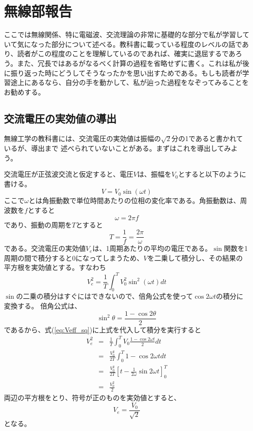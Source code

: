 \chapter*{無線部報告}
ここでは無線関係、特に電磁波、交流理論の非常に基礎的な部分で私が学習していて気になった部分について述べる。教科書に載っている程度のレベルの話であり、読者がこの程度のことを理解しているのであれば、確実に退屈するであろう。また、冗長ではあるがなるべく計算の過程を省略せずに書く。これは私が後に振り返った時にどうしてそうなったかを思い出すためである。もしも読者が学習途上にあるなら、自分の手を動かして、私が辿った過程をなぞってみることをお勧めする。

\section*{交流電圧の実効値の導出}
無線工学の教科書には、交流電圧の実効値は振幅の$\sqrt{2}$分の1であると書かれているが、導出まで
述べられていないことがある。まずはこれを導出してみよう。

交流電圧が正弦波交流と仮定すると、電圧$V$は、振幅を$V_0$とすると以下のように書ける。
\begin{equation}
V=V_0 \sin(\omega t) \label{eq:defv}
\end{equation}
ここで$\omega$とは角振動数で単位時間あたりの位相の変化率である。角振動数は、周波数を$f$とすると
\[
\omega = 2 \pi f
\]
であり、振動の周期を$T$とすると
\[
T = \frac{1}{f} = \frac{2 \pi}{\omega}
\]
である。交流電圧の実効値$V_e$は、1周期あたりの平均の電圧である。$\sin$関数を1周期の間で積分すると$0$になってしまうため、$V$を二乗して積分し、その結果の平方根を実効値とする。すなわち
\begin{equation}
V_e^2 =\frac{1}{T} \int_{0}^{T}V_0^2\sin^2(\omega t)dt \label{eq:Veff_sq}
\end{equation}
$\sin$の二乗の積分はすぐにはできないので、倍角公式を使って$\cos 2\omega t$の積分に変換する。
倍角公式は、
\[
\sin^2\theta = \frac{1-\cos 2\theta}{2}
\]
であるから、式(\ref{eq:Veff_sq})に上式を代入して積分を実行すると
\begin{eqnarray*}
V_e^2 &=& \frac{1}{T}\int_{0}^{T} V_0 \frac{1-\cos 2\omega t}{2} dt \\
&=& \frac{V_0^2}{2T}\int_0^{T} 1 - \cos 2\omega t dt \\
&=& \frac{V_0^2}{2T}[t - \frac{1}{2 \omega}\sin 2\omega t ]_0^{T} \\
&=& \frac{V_0^2}{2}
\end{eqnarray*}
両辺の平方根をとり、符号が正のものを実効値とすると、
\[
V_e = \frac{V_0}{\sqrt{2}}
\]
となる。

